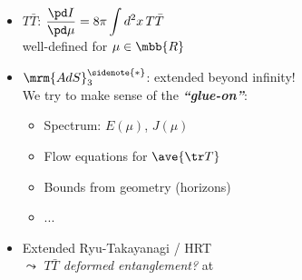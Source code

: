 \documentclass[12pt]{article}
\newcommand{\TTbar}{\texorpdfstring{\ensuremath{T\bar{T}}}{TTbar}\xspace}
\begin{document}
\begin{minipage}{.43\linewidth}
\vspace{-6ex}
\begin{itemize}[leftmargin=-3em,itemsep=-.5ex]
\item \TTbar: $ \dfrac{\pd I}{\pd\mu} = {8 \pi} \displaystyle\int d^2x \, T\bar T$\\[1ex]
well-defined for $\mu \in \mbb{R}$
\item $\mrm{AdS}_3^{\sidenote{*}}$: extended beyond infinity!\\
We try to make sense of the \textit{\textbf{``glue-on''}}:

\begin{itemize}[leftmargin=5.5em,noitemsep]
\item Spectrum: $E(\mu)$, $J(\mu)$
\item Flow equations for $\ave{\tr T}$
\item Bounds from geometry (horizons)
\item ...
\end{itemize}

\item Extended Ryu-Takayanagi / HRT\\
	$\leadsto$ \textit{\TTbar deformed entanglement?}
	at 
\end{itemize}




\end{minipage}

\clearpage
\end{document}
